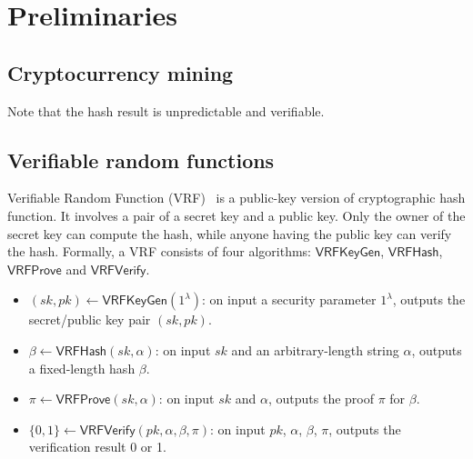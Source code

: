 \section{Preliminaries}

\subsection{Cryptocurrency mining}




Note that the hash result is unpredictable and verifiable.

\subsection{Verifiable random functions}

Verifiable Random Function (VRF)~\cite{micali1999verifiable} is a public-key version of cryptographic hash function.
It involves a pair of a secret key and a public key.
Only the owner of the secret key can compute the hash, while anyone having the public key can verify the hash.
Formally, a VRF consists of four algorithms: $\mathsf{VRFKeyGen}$, $\mathsf{VRFHash}$, $\mathsf{VRFProve}$ and $\mathsf{VRFVerify}$.

\begin{itemize}
    \item $(sk, pk) \gets \mathsf{VRFKeyGen}(1^{\lambda})$: on input a security parameter $1^{\lambda}$, outputs the secret/public key pair $(sk, pk)$.
    \item $\beta \gets \mathsf{VRFHash}(sk, \alpha)$: on input $sk$ and an arbitrary-length string $\alpha$, outputs a fixed-length hash $\beta$.
    \item $\pi \gets \mathsf{VRFProve}(sk, \alpha)$: on input $sk$ and $\alpha$, outputs the proof $\pi$ for $\beta$.
    \item $\{0, 1\} \gets \mathsf{VRFVerify}(pk, \alpha, \beta, \pi)$: on input $pk$, $\alpha$, $\beta$, $\pi$, outputs the verification result 0 or 1.
\end{itemize}

